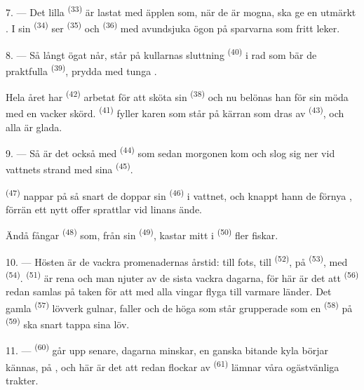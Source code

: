 7. --- Det lilla  \textsuperscript{(33)} är lastat med äpplen som, när de
är mogna, ska ge en utmärkt . I sin  \textsuperscript{(34)} ser
 \textsuperscript{(35)} och
 \textsuperscript{(36)} med avundsjuka ögon på sparvarna som
fritt leker.

8. --- Så långt ögat når, står på kullarnas sluttning 
\textsuperscript{(40)} i rad som bär de praktfulla  \textsuperscript{(39)},
prydda med tunga .

Hela året har  \textsuperscript{(42)} arbetat för att sköta sin
 \textsuperscript{(38)} och nu belönas han för sin möda med en vacker skörd.
 \textsuperscript{(41)} fyller karen som står på kärran som dras av
 \textsuperscript{(43)}, och alla är glada.

\VUsaut{5.0mm}
\VUsaut{3.4mm}

9. --- Så är det också med  \textsuperscript{(44)} som sedan morgonen kom och
slog sig ner vid vattnets strand med sina  \textsuperscript{(45)}.

 \textsuperscript{(47)} nappar på  så snart de
doppar sin  \textsuperscript{(46)} i vattnet, och knappt hann de förnya
, förrän ett nytt offer sprattlar vid linans ände.

Ändå fångar  \textsuperscript{(48)} som, från sin
 \textsuperscript{(49)}, kastar  mitt i
 \textsuperscript{(50)} fler fiskar.

10. --- Hösten är de vackra promenadernas årstid: till fots, till 
\textsuperscript{(52)}, på  \textsuperscript{(53)}, med
 \textsuperscript{(54)}.  \textsuperscript{(51)} är
rena och man njuter av de sista vackra dagarna, för här är det att
 \textsuperscript{(56)} redan samlas på taken för att med alla
vingar flyga till varmare länder. Det gamla  \textsuperscript{(57)}
lövverk gulnar,  faller och de höga
 som står grupperade som en 
\textsuperscript{(58)} på  \textsuperscript{(59)} ska snart tappa sina löv.

11. ---  \textsuperscript{(60)} går upp senare, dagarna minskar, en ganska
bitande kyla börjar kännas, på , och här är det att redan flockar av
 \textsuperscript{(61)} lämnar våra ogästvänliga trakter.
\VUsaut{6.0mm}
\VUfilet{22mm}
